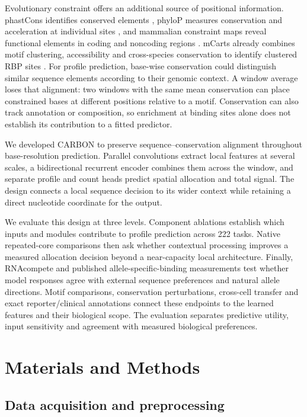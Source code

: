 \documentclass[webpdf,contemporary,large]{oup-authoring-template}
\begin{document}
Evolutionary constraint offers an additional source of positional information. phastCons identifies conserved elements \citep{siepel2005phylop}, phyloP measures conservation and acceleration at individual sites \citep{pollard2010phylop}, and mammalian constraint maps reveal functional elements in coding and noncoding regions \citep{lindbladtoh2011constraint}. mCarts already combines motif clustering, accessibility and cross-species conservation to identify clustered RBP sites \citep{zhang2013mcarts}. For profile prediction, base-wise conservation could distinguish similar sequence elements according to their genomic context. A window average loses that alignment: two windows with the same mean conservation can place constrained bases at different positions relative to a motif. Conservation can also track annotation or composition, so enrichment at binding sites alone does not establish its contribution to a fitted predictor.

We developed CARBON to preserve sequence--conservation alignment throughout base-resolution prediction. Parallel convolutions extract local features at several scales, a bidirectional recurrent encoder combines them across the window, and separate profile and count heads predict spatial allocation and total signal. The design connects a local sequence decision to its wider context while retaining a direct nucleotide coordinate for the output.

We evaluate this design at three levels. Component ablations establish which inputs and modules contribute to profile prediction across 222 tasks. Native repeated-core comparisons then ask whether contextual processing improves a measured allocation decision beyond a near-capacity local architecture. Finally, RNAcompete and published allele-specific-binding measurements test whether model responses agree with external sequence preferences and natural allele directions. Motif comparisons, conservation perturbations, cross-cell transfer and exact reporter/clinical annotations connect these endpoints to the learned features and their biological scope. The evaluation separates predictive utility, input sensitivity and agreement with measured biological preferences.

\section{Materials and Methods}\label{sec2}

\subsection{Data acquisition and preprocessing}\label{subsec:data}
\end{document}
